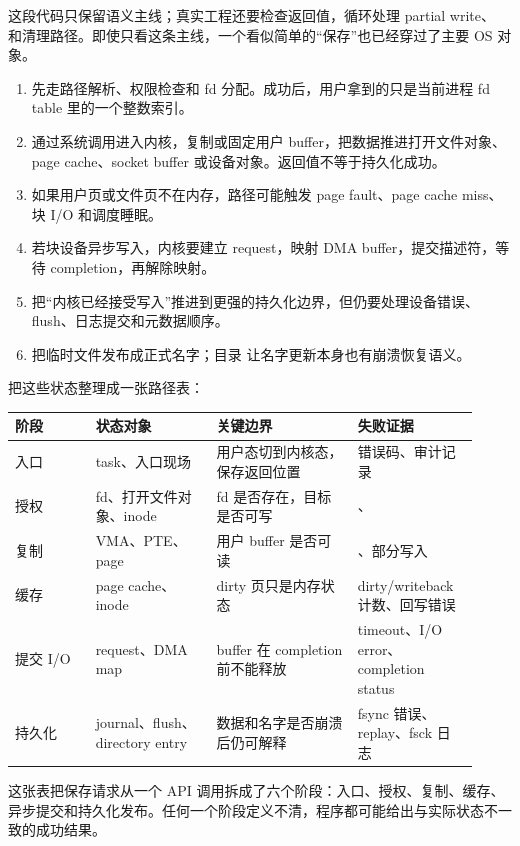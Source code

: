 这段代码只保留语义主线；真实工程还要检查返回值，循环处理 partial write、 和清理路径。即使只看这条主线，一个看似简单的“保存”也已经穿过了主要 OS 对象。

\begin{enumerate}
\tightlist
\item {} 先走路径解析、权限检查和 fd 分配。成功后，用户拿到的只是当前进程 fd table 里的一个整数索引。
\item {} 通过系统调用进入内核，复制或固定用户 buffer，把数据推进打开文件对象、page cache、socket buffer 或设备对象。返回值不等于持久化成功。
\item 如果用户页或文件页不在内存，路径可能触发 page fault、page cache miss、块 I/O 和调度睡眠。
\item 若块设备异步写入，内核要建立 request，映射 DMA buffer，提交描述符，等待 completion，再解除映射。
\item {} 把“内核已经接受写入”推进到更强的持久化边界，但仍要处理设备错误、flush、日志提交和元数据顺序。
\item {} 把临时文件发布成正式名字；目录  让名字更新本身也有崩溃恢复语义。
\end{enumerate}

把这些状态整理成一张路径表：

\begin{longtable}{|L{0.16\linewidth}|L{0.24\linewidth}|L{0.28\linewidth}|L{0.24\linewidth}|}
\toprule
阶段 & 状态对象 & 关键边界 & 失败证据 \\
\midrule
入口 & task、入口现场 & 用户态切到内核态，保存返回位置 & 错误码、审计记录 \\\tablerowrule
授权 & fd、打开文件对象、inode & fd 是否存在，目标是否可写 & 、 \\\tablerowrule
复制 & VMA、PTE、page & 用户 buffer 是否可读 & 、部分写入 \\\tablerowrule
缓存 & page cache、inode & dirty 页只是内存状态 & dirty/writeback 计数、回写错误 \\\tablerowrule
提交 I/O & request、DMA map & buffer 在 completion 前不能释放 & timeout、I/O error、completion status \\\tablerowrule
持久化 & journal、flush、directory entry & 数据和名字是否崩溃后仍可解释 & fsync 错误、replay、fsck 日志 \\
\bottomrule
\end{longtable}

这张表把保存请求从一个 API 调用拆成了六个阶段：入口、授权、复制、缓存、异步提交和持久化发布。任何一个阶段定义不清，程序都可能给出与实际状态不一致的成功结果。

